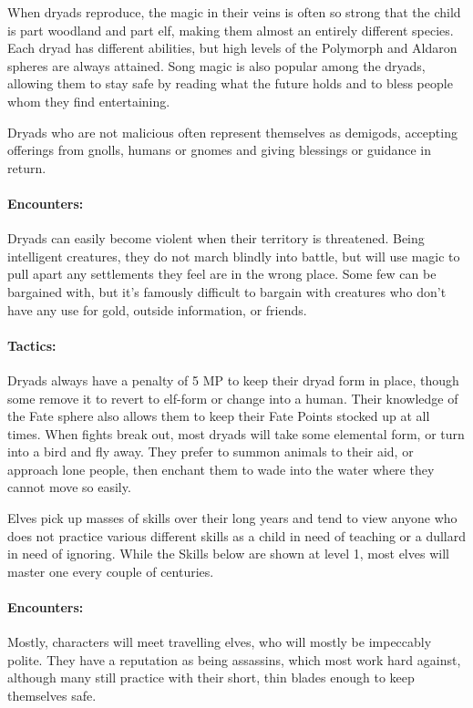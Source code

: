 \begin{multicols}{2}
When dryads reproduce, the magic in their veins is often so strong that the child is part woodland and part elf, making them almost an entirely different species.
Each dryad has different abilities, but high levels of the Polymorph and Aldaron spheres are always attained.
Song magic is also popular among the dryads, allowing them to stay safe by reading what the future holds and to bless people whom they find entertaining.

Dryads who are not malicious often represent themselves as demigods, accepting offerings from gnolls, humans or gnomes and giving blessings or guidance in return.

\dryad

\paragraph{Encounters:} Dryads can easily become violent when their territory is threatened.
Being intelligent creatures, they do not march blindly into battle, but will use magic to pull apart any settlements they feel are in the wrong place.
Some few can be bargained with, but it's famously difficult to bargain with creatures who don't have any use for gold, outside information, or friends.

\paragraph{Tactics:}
Dryads always have a penalty of 5 MP to keep their dryad form in place, though some remove it to revert to elf-form or change into a human.
Their knowledge of the Fate sphere also allows them to keep their Fate Points stocked up at all times.
When fights break out, most dryads will take some elemental form, or turn into a bird and fly away.
They prefer to summon animals to their aid, or approach lone people, then enchant them to wade into the water where they cannot move so easily.

\label{elf}

Elves pick up masses of skills over their long years and tend to view anyone who does not practice various different skills as a child in need of teaching or a dullard in need of ignoring.  While the Skills below are shown at level 1, most elves will master one every couple of centuries.

\paragraph{Encounters:} Mostly, characters will meet travelling elves, who will mostly be impeccably polite.
They have a reputation as being assassins, which most work hard against, although many still practice with their short, thin blades enough to keep themselves safe.


\end{multicols}
